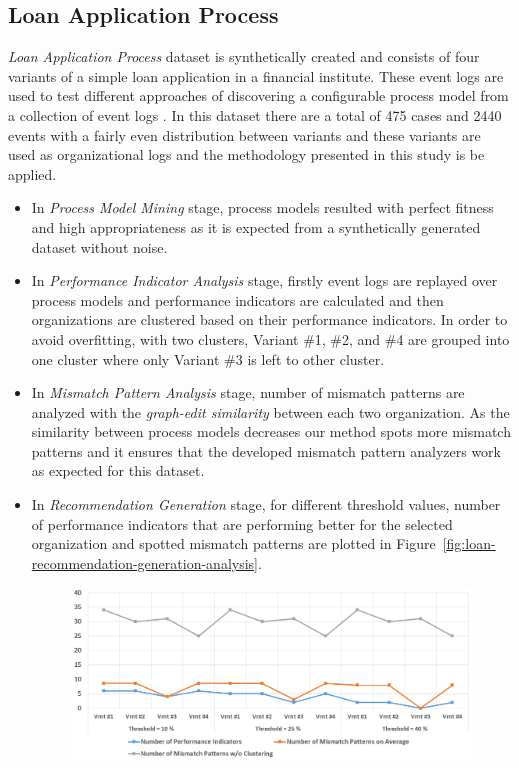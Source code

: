 \subsection{Loan Application Process}
\label{subsec:loan-app-process}
\textit{Loan Application Process} dataset is synthetically created and consists of four variants of a simple loan application in a financial institute. These event logs are used to test different approaches of discovering a configurable process model from a collection of event logs \cite{buijs2014flexible}. In this dataset there are a total of 475 cases and 2440 events with a fairly even distribution between variants and these variants are used as organizational logs and the methodology presented in this study is be applied.

\begin{itemize}
  \item In \textit{Process Model Mining} stage, process models resulted with perfect fitness and high appropriateness as it is expected from a synthetically generated dataset without noise.
  \item In \textit{Performance Indicator Analysis} stage, firstly event logs are replayed over process models and performance indicators are calculated and then organizations are clustered based on their performance indicators. In order to avoid overfitting,  with two clusters, Variant \#1, \#2, and \#4 are grouped into one cluster where only Variant \#3 is left to other cluster. 
  \item In \textit{Mismatch Pattern Analysis} stage, number of mismatch patterns are analyzed with the \textit{graph-edit similarity} between each two organization. As the similarity between process models decreases our method spots more mismatch patterns and it ensures that the developed mismatch pattern analyzers work as expected for this dataset. 
  \item In \textit{Recommendation Generation} stage, for different threshold values, number of performance indicators that are performing better for the selected organization and spotted mismatch patterns are plotted in Figure~\ref{fig:loan-recommendation-generation-analysis}. 
    \begin{figure}
    	\centering
    	\includegraphics[width=\textwidth]{5_results_discussions/loan-application-process/recommendation-generation-analysis}

\end{figure}
\end{itemize}
